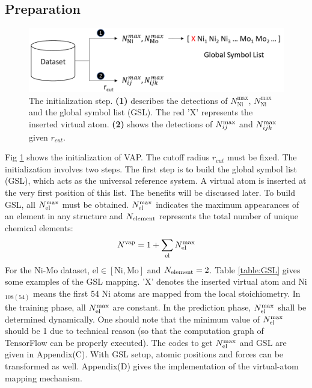 \documentclass[preprint]{revtex4-2}
\begin{document}
% 
%
\subsection{Preparation}
\label{section:preparation}

% 
%
\begin{figure}[h!]
\centering
\includegraphics[scale=0.6]{figures/Fig2.pdf}
\caption{\label{fig:Fig2} The initialization step. 
\textbf{(1)} describes the detections of $N_{\mathrm{Ni}}^{\mathrm{max}}$, 
$N_{\mathrm{Ni}}^{\mathrm{max}}$ and the global symbol list (GSL). The red 'X' 
represents the inserted virtual atom.
\textbf{(2)} shows the detections of $N_{ij}^{\mathrm{max}}$ and $N_{ijk}^{\mathrm{max}}$ given $r_{cut}$.
}
\end{figure}

Fig \ref{fig:Fig2} shows the initialization of VAP. The cutoff radius $r_{cut}$ 
must be fixed. The initialization involves two steps. The first step is to build 
the global symbol list (GSL), which acts as the universal reference system. A 
virtual atom is inserted at the very first position of this list. The benefits 
will be discussed later. To build GSL, all $N^{\mathrm{max}}_{\mathrm{el}}$ must be obtained. 
$N^{\mathrm{max}}_{\mathrm{el}}$ indicates the maximum appearances of an element in any structure and 
$N_{\mathrm{element}}$ represents the total number of unique chemical elements:
\begin{equation}
\label{eq:n_vap}
N^{\mathrm{vap}} = 1 + \sum_{\mathrm{el}}{N^{\mathrm{max}}_{\mathrm{el}}}
\end{equation}
For the Ni-Mo dataset, $\mathrm{el} \in [\mathrm{Ni}, \mathrm{Mo}]$ and 
$N_{\mathrm{element}} = 2$. 
Table \ref{table:GSL} gives some examples of the GSL mapping. 'X' denotes the 
inserted virtual atom and Ni$_{108(54)}$ means the first 54 Ni atoms are mapped 
from the local stoichiometry. In the training phase, all $N^{\mathrm{max}}_{\mathrm{el}}$ are constant.
In the prediction phase, $N^{\mathrm{max}}_{\mathrm{el}}$ shall be determined dynamically. One should 
note that the minimum value of $N^{\mathrm{max}}_{\mathrm{el}}$ should be 1 due to technical reason (so 
that the computation graph of TensorFlow can be properly executed). The codes to
get $N^{\mathrm{max}}_{\mathrm{el}}$ and GSL are given in Appendix(C). With GSL setup, atomic positions
and forces can be transformed as well. Appendix(D) gives the implementation of 
the virtual-atom mapping mechanism. 
\end{document}
